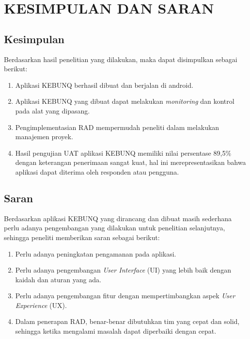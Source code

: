 \chapter{KESIMPULAN DAN SARAN}

%
\vspace{4.5pt}

\begin{flushleft}
    \begin{justify}
        \section{Kesimpulan}
        Berdasarkan hasil penelitian yang dilakukan, maka dapat disimpulkan sebagai berikut:
        \begin{enumerate}
            \item Aplikasi KEBUNQ berhasil dibuat dan berjalan di android.
            \item Aplikasi KEBUNQ yang dibuat dapat melakukan \emph{monitoring} dan kontrol pada alat yang dipasang.
            \item Pengimplementasian RAD mempermudah peneliti dalam melakukan manajemen proyek.
            \item Hasil pengujian UAT aplikasi KEBUNQ memiliki nilai persentase 89,5\% dengan keterangan penerimaan sangat kuat, hal ini merepresentasikan bahwa aplikasi dapat diterima oleh responden atau pengguna.\\
        \end{enumerate}

        \section{Saran}
        Berdasarkan aplikasi KEBUNQ yang dirancang dan dibuat masih sederhana perlu adanya pengembangan yang dilakukan untuk penelitian selanjutnya, sehingga peneliti memberikan saran sebagai berikut:
        \begin{enumerate}
            \item Perlu adanya peningkatan pengamanan pada aplikasi.
            \item Perlu adanya pengembangan \emph{User Interface} (UI) yang lebih baik dengan kaidah dan aturan yang ada.
            \item Perlu adanya pengembangan fitur dengan mempertimbangkan aspek \emph{User Experience} (UX).
            \item Dalam penerapan RAD, benar-benar dibutuhkan tim yang cepat dan solid, sehingga ketika mengalami masalah dapat diperbaiki dengan cepat.
        \end{enumerate}

            
    \end{justify}
        
\end{flushleft}

\newpage